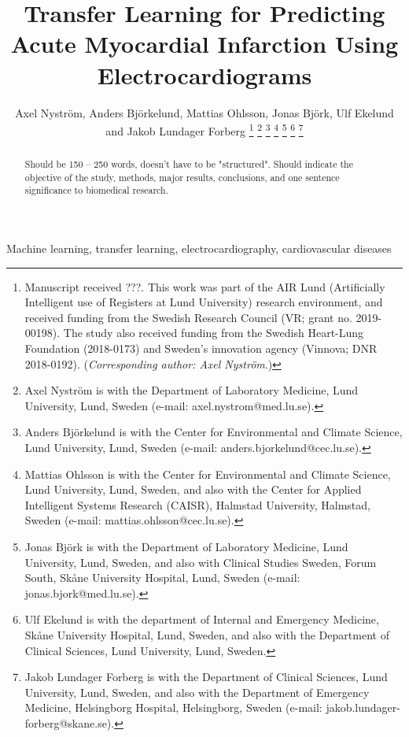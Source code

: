 \documentclass[journal,twoside,web]{ieeecolor}
\begin{document}
\title{Transfer Learning for Predicting Acute Myocardial Infarction Using Electrocardiograms}
\author{Axel Nyström, Anders Björkelund, Mattias Ohlsson, Jonas Björk, Ulf Ekelund and Jakob Lundager Forberg
\thanks{Manuscript received ???. This work was part of the AIR Lund (Artificially Intelligent use of Registers at Lund University) research environment, and received funding from the Swedish Research Council (VR; grant no. 2019-00198). The study also received funding from the Swedish Heart-Lung Foundation (2018-0173) and Sweden's innovation agency (Vinnova; DNR 2018-0192). (\textit{Corresponding author: Axel Nyström}.)}
\thanks{Axel Nyström is with the Department of Laboratory Medicine, Lund University, Lund, Sweden (e-mail: axel.nystrom@med.lu.se).}
\thanks{Anders Björkelund is with the Center for Environmental and Climate Science, Lund University, Lund, Sweden (e-mail: anders.bjorkelund@cec.lu.se).}
\thanks{Mattias Ohlsson is with the Center for Environmental and Climate Science, Lund University, Lund, Sweden, and also with the Center for Applied Intelligent Systems Research (CAISR), Halmstad University, Halmstad, Sweden (e-mail: mattias.ohlsson@cec.lu.se).}
\thanks{Jonas Björk is with the Department of Laboratory Medicine, Lund University, Lund, Sweden, and also with Clinical Studies Sweden, Forum South, Skåne University Hospital, Lund, Sweden (e-mail: jonas.bjork@med.lu.se).}
\thanks{Ulf Ekelund is with the department of Internal and Emergency Medicine, Skåne University Hospital, Lund, Sweden, and also with the Department of Clinical Sciences, Lund University, Lund, Sweden.}
\thanks{Jakob Lundager Forberg is with the Department of Clinical Sciences, Lund University, Lund, Sweden, and also with the Department of Emergency Medicine, Helsingborg Hospital, Helsingborg, Sweden (e-mail: jakob.lundager-forberg@skane.se).}
}

\maketitle

\begin{abstract}
Should be 150 -- 250 words, doesn't have to be "structured". Should indicate the objective of the study, methods, major results, conclusions, and one sentence significance to biomedical research.
\end{abstract}

\begin{IEEEkeywords}
Machine learning, transfer learning, electrocardiography, cardiovascular diseases
\end{IEEEkeywords}
\end{document}
